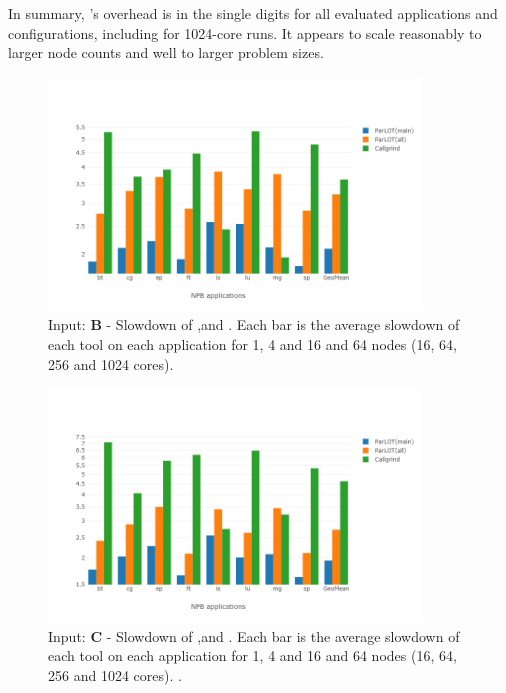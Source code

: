 In summary, \parlot 's overhead is in the single digits for all evaluated applications and configurations, including for 1024-core runs. It appears to scale reasonably to larger node counts and well to larger problem sizes.


\begin{figure}[!t]
\centering
\includegraphics[width=3.9in]{figs.comet.newMed/comet_chartAvg_sd_B_p3_5.png}
\caption{ Input: \textbf{B} - Slowdown of \parlotm ,\parlota and \callgrind. Each bar is the average slowdown of each tool on each application for 1, 4 and 16 and 64 nodes (16, 64, 256 and 1024 cores). 
}
\label{comet_chartAvg_sd_B_p3_5}
\end{figure}


\begin{figure}[!t]
\centering
\includegraphics[width=3.9in]{figs.comet.newMed/comet_chartAvg_sd_C_p3_5.png}
\caption{ Input: \textbf{C} - Slowdown of \parlotm ,\parlota and \callgrind. Each bar is the average slowdown of each tool on each application for 1, 4 and 16 and 64 nodes (16, 64, 256 and 1024 cores). . 
}
\label{comet_chartAvg_sd_C_p3_5}
\end{figure}






